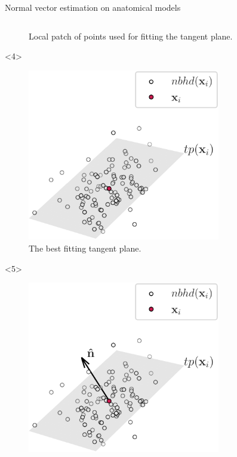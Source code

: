 \documentclass[xcolor=dvipsnames,10pt]{beamer}
\begin{document}
\begin{frame}{Normal vector estimation on anatomical models}
\begin{columns}[c]
\begin{column}{0.5\textwidth}
\begin{onlyenv}
\begin{center}
\begin{figure}
                    \caption{Local patch of points used for fitting the tangent plane.}
                \end{figure}
                \end{center}
            \end{onlyenv}
            \begin{onlyenv}<4>
                \begin{center}
                \begin{figure}
                    \includegraphics[width=0.75\textwidth]{figures/orthogonal_set_2.pdf}
                    \caption{The best fitting tangent plane.}
                \end{figure}
                \end{center}
            \end{onlyenv}
            \begin{onlyenv}<5>
                \begin{center}
                \begin{figure}
                    \includegraphics[width=0.75\textwidth]{figures/orthogonal_set_3.pdf}

\end{figure}
\end{center}
\end{onlyenv}
\end{column}
\end{columns}
\end{frame}
\end{document}
